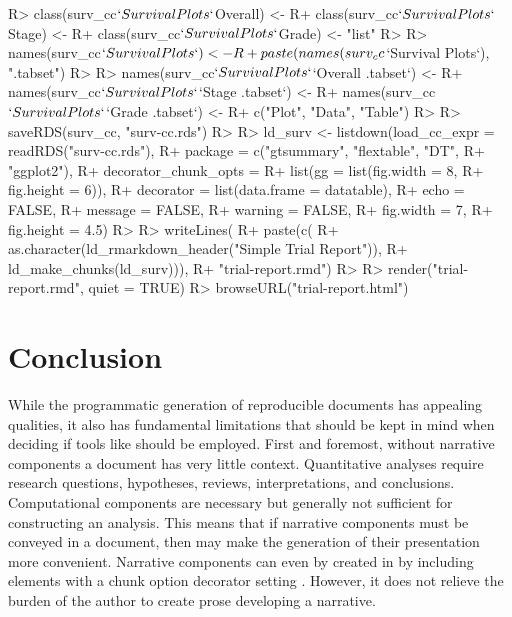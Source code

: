 \documentclass[
]{jss}
\begin{document}
\begin{CodeChunk}

\begin{CodeInput}
R> class(surv_cc$`Survival Plots`$Overall) <- 
R+   class(surv_cc$`Survival Plots`$Stage) <-
R+   class(surv_cc$`Survival Plots`$Grade) <- "list"
R> 
R> names(surv_cc$`Survival Plots`) <- 
R+   paste(names(surv_cc$`Survival Plots`), "{.tabset}")
R> 
R> names(surv_cc$`Survival Plots`$`Overall {.tabset}`) <- 
R+   names(surv_cc$`Survival Plots`$`Stage {.tabset}`) <- 
R+   names(surv_cc$`Survival Plots`$`Grade {.tabset}`) <- 
R+   c("Plot", "Data", "Table")
R>   
R> saveRDS(surv_cc, "surv-cc.rds")
R> 
R> ld_surv <- listdown(load_cc_expr = readRDS("surv-cc.rds"),
R+                     package = c("gtsummary", "flextable", "DT", 
R+                                 "ggplot2"),
R+                     decorator_chunk_opts = 
R+                       list(gg = list(fig.width = 8,
R+                                      fig.height = 6)),
R+                     decorator = list(data.frame = datatable),
R+                     echo = FALSE,
R+                     message = FALSE,
R+                     warning = FALSE,
R+                     fig.width = 7,
R+                     fig.height = 4.5)
R> 
R> writeLines(
R+   paste(c(
R+     as.character(ld_rmarkdown_header("Simple Trial Report")),
R+     ld_make_chunks(ld_surv))),
R+   "trial-report.rmd")
R> 
R> render("trial-report.rmd", quiet = TRUE)
R> browseURL("trial-report.html")
\end{CodeInput}
\end{CodeChunk}

\hypertarget{conclusion}{%
\section{Conclusion}\label{conclusion}}

While the programmatic generation of reproducible documents has
appealing qualities, it also has fundamental limitations that should be
kept in mind when deciding if tools like  should be
employed. First and foremost, without narrative components a document
has very little context. Quantitative analyses require research
questions, hypotheses, reviews, interpretations, and conclusions.
Computational components are necessary but generally not sufficient for
constructing an analysis. This means that if narrative components must
be conveyed in a document, then  may make the generation
of their presentation more convenient. Narrative components can even by
created in  by including  elements with a
chunk option decorator setting . However, it
does not relieve the burden of the author to create prose developing a
narrative.
\end{document}
